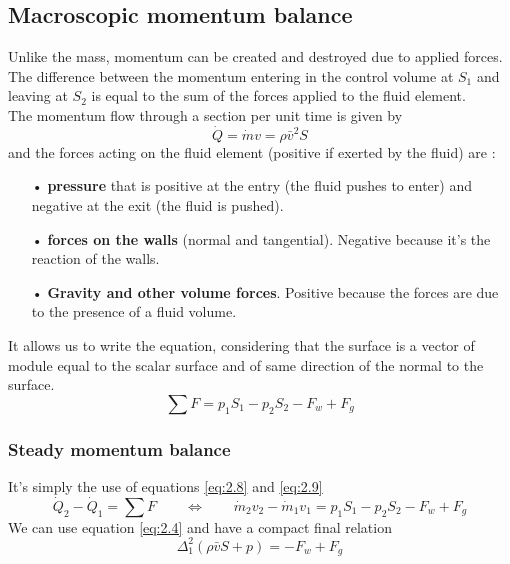 	\subsection{Macroscopic momentum balance}
		Unlike the mass, momentum can be created and destroyed due to applied forces. The difference between the momentum entering in the control volume at $S_1$ and leaving at $S_2$ is equal to the sum of the forces applied to the fluid element. \\
		The momentum flow through a section per unit time is given by 
		\begin{equation}
			\dot{Q} = \dot{m}v = \rho \bar{v}^2 S
			\label{eq:2.8}
		\end{equation}
			and the forces acting on the fluid element (positive if exerted by the fluid) are :
			
		\begin{itemize}
				\item[•] \textbf{pressure} that is positive at the entry (the fluid pushes to enter) and negative at the exit (the fluid is pushed).
				\item[•] \textbf{forces on the walls} (normal and tangential). Negative because it's the reaction of the walls.
				\item[•] \textbf{Gravity and other volume forces}. Positive because the forces are due to the presence of a fluid volume. \\
		\end{itemize}

		It allows us to write the equation, considering that the surface is a vector of module equal to the scalar surface and of same direction of the normal to the surface. 
		\begin{equation}
			\sum F = p_1S_1 - p_2S_2 - F_w + F_g
			\label{eq:2.9}
		\end{equation}
		
		\subsubsection{Steady momentum balance}
			It's simply the use of equations \autoref{eq:2.8} and \autoref{eq:2.9}			
			\begin{equation}
				\dot{Q}_2 - \dot{Q}_1 = \sum F \qquad \Leftrightarrow \qquad \dot{m}_2v_2 - \dot{m}_1v_1 = p_1S_1 -p_2S_2 - F_w + F_g
			\end{equation}
			We can use equation \autoref{eq:2.4} and have a compact final relation 
			\begin{equation}
				\Delta ^2 _1 (\rho \bar{v}S + p) = -F_w+F_g
			\end{equation}
			
